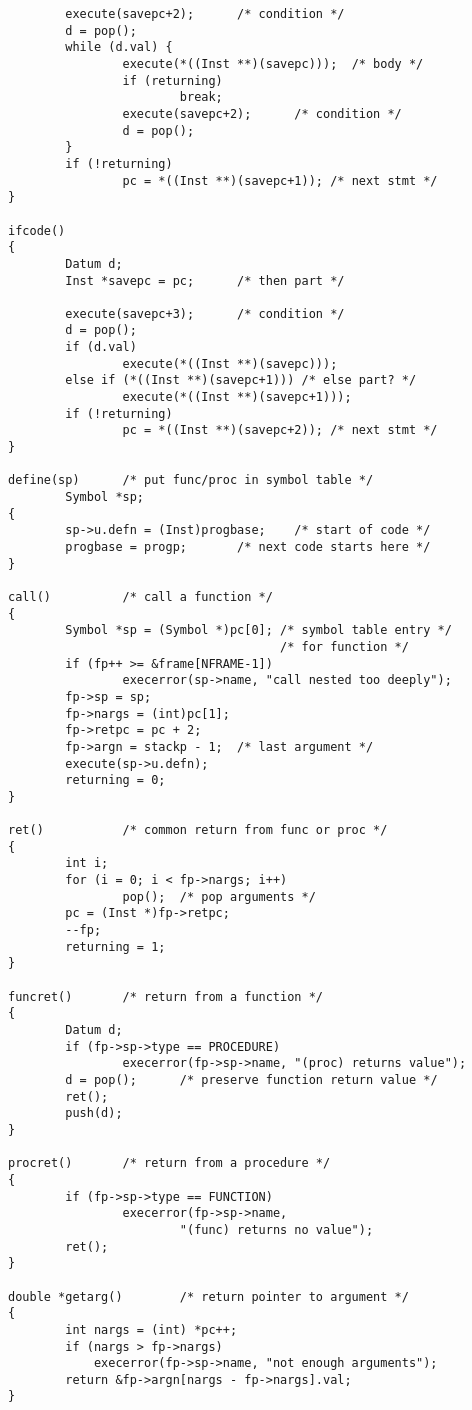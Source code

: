 \begin{verbatim}
        execute(savepc+2);      /* condition */
        d = pop();
        while (d.val) {
                execute(*((Inst **)(savepc)));  /* body */
                if (returning)
                        break;
                execute(savepc+2);      /* condition */
                d = pop();
        }
        if (!returning)
                pc = *((Inst **)(savepc+1)); /* next stmt */
}

ifcode() 
{
        Datum d;
        Inst *savepc = pc;      /* then part */

        execute(savepc+3);      /* condition */
        d = pop();
        if (d.val)
                execute(*((Inst **)(savepc)));  
        else if (*((Inst **)(savepc+1))) /* else part? */
                execute(*((Inst **)(savepc+1)));
        if (!returning)
                pc = *((Inst **)(savepc+2)); /* next stmt */
}

define(sp)      /* put func/proc in symbol table */
        Symbol *sp;
{
        sp->u.defn = (Inst)progbase;    /* start of code */
        progbase = progp;       /* next code starts here */
}

call()          /* call a function */
{
        Symbol *sp = (Symbol *)pc[0]; /* symbol table entry */
                                      /* for function */
        if (fp++ >= &frame[NFRAME-1])
                execerror(sp->name, "call nested too deeply");
        fp->sp = sp;
        fp->nargs = (int)pc[1];
        fp->retpc = pc + 2;
        fp->argn = stackp - 1;  /* last argument */
        execute(sp->u.defn);
        returning = 0;
}

ret()           /* common return from func or proc */
{
        int i;
        for (i = 0; i < fp->nargs; i++)
                pop();  /* pop arguments */
        pc = (Inst *)fp->retpc;
        --fp;
        returning = 1;
}

funcret()       /* return from a function */
{
        Datum d;
        if (fp->sp->type == PROCEDURE)
                execerror(fp->sp->name, "(proc) returns value");
        d = pop();      /* preserve function return value */
        ret();
        push(d);
}

procret()       /* return from a procedure */
{
        if (fp->sp->type == FUNCTION)
                execerror(fp->sp->name,
                        "(func) returns no value");
        ret();
}

double *getarg()        /* return pointer to argument */
{
        int nargs = (int) *pc++;
        if (nargs > fp->nargs)
            execerror(fp->sp->name, "not enough arguments");
        return &fp->argn[nargs - fp->nargs].val;
}


\end{verbatim}
